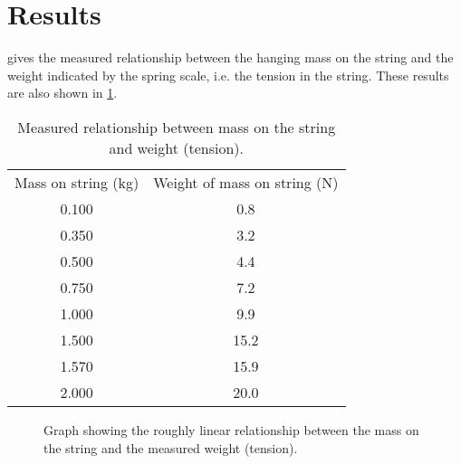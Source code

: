 \documentclass[reprint,amsmath,amssymb,aps,twoside]{revtex4-2}
\begin{document}
    
\section{Results}
       
 gives the measured relationship between the hanging mass on the string and the weight indicated by the spring scale, i.e. the tension in the string. These results are also shown in \cref{fig:mass_tension_graph}. 

\begin{table}
\caption{\label{tab:table1} Measured relationship between mass on the string and weight (tension).}
\begin{center}
\begin{ruledtabular}
\begin{tabular}{cc}
Mass on string (\unit{\kilo\gram}) & Weight of mass on string (\unit{\newton}) \\
\colrule
0.100   &   0.8  \\
0.350   &   3.2  \\
0.500   &   4.4  \\
0.750   &   7.2  \\
1.000  &   9.9  \\
1.500  &   15.2 \\
1.570  &   15.9 \\
2.000  &   20.0 \\
\end{tabular}
\end{ruledtabular}
\end{center}
\end{table}
        
\begin{figure}
\begin{center}
\end{center}
\caption{\label{fig:mass_tension_graph} Graph showing the roughly linear relationship between the mass on the string and the measured weight (tension).}
\end{figure}
\end{document}
